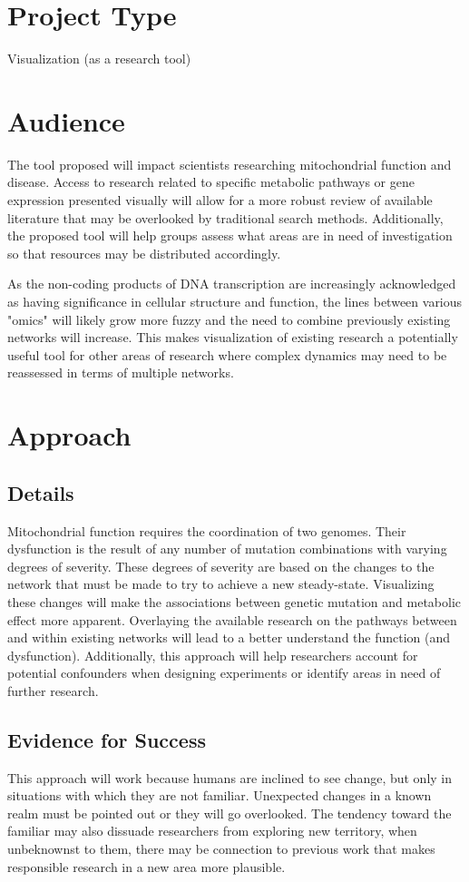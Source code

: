 \documentclass{proc}	%
\begin{document}
\section{Project Type}
Visualization (as a research tool)

\section{Audience} 
The tool proposed will impact scientists researching mitochondrial function and disease. Access to research related to specific metabolic pathways or gene expression presented visually will allow for a more robust review of available literature that may be overlooked by traditional search methods. Additionally, the proposed tool will help groups assess what areas are in need of investigation so that resources may be distributed accordingly.

As the non-coding products of DNA transcription are increasingly acknowledged as having significance in cellular structure and function, the lines between various "omics" will likely grow more fuzzy and the need to combine previously existing networks will increase. This makes visualization of existing research a potentially useful tool for other areas of research where complex dynamics may need to be reassessed in terms of multiple networks.

\section{Approach}
\subsection{Details}
Mitochondrial function requires the coordination of two genomes. Their dysfunction is the result of any number of mutation combinations with varying degrees of severity. These degrees of severity are based on the changes to the network that must be made to try to achieve a new steady-state. Visualizing these changes will make the associations between genetic mutation and metabolic effect more apparent. Overlaying the available research on the pathways between and within existing networks will lead to a better understand the function (and dysfunction). Additionally, this approach will help researchers account for potential confounders when designing experiments or identify areas in need of further research.

\subsection{Evidence for Success}
This approach will work because humans are inclined to see change, but only in situations with which they are not familiar. Unexpected changes in a known realm must be pointed out or they will go overlooked. The tendency toward the familiar may also dissuade researchers from exploring new territory, when unbeknownst to them, there may be connection to previous work that makes responsible research in a new area more plausible. 
\end{document}
